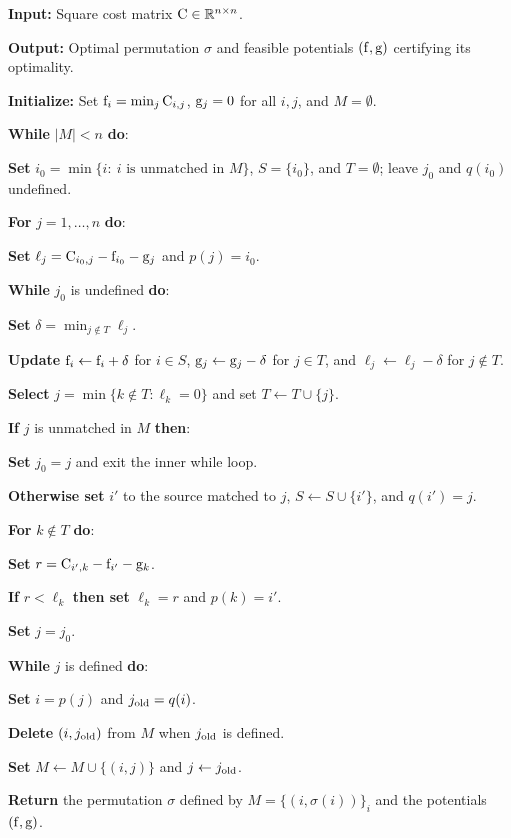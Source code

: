 \begin{algH}\label{alg:hungarian-primal-dual}
\textbf{Input:} Square cost matrix $\mathrm{C}\in\mathbb{R}^{n\times n}$.

\textbf{Output:} Optimal permutation $\sigma$ and feasible potentials $(\mathrm{f},\mathrm{g})$ certifying its optimality.

\textbf{Initialize:} Set $\mathrm{f}_i=\min_j \mathrm{C}_{i,j}$, $\mathrm{g}_j=0$ for all $i,j$, and $M=\emptyset$.

\textbf{While} $|M|<n$ \textbf{do}:
\begin{algblock}

\textbf{Set} $i_0=\min\{i:\ i\text{ is unmatched in }M\}$, $S=\{i_0\}$, and $T=\emptyset$; leave $j_0$ and $q(i_0)$ undefined.

\textbf{For} $j=1,\ldots,n$ \textbf{do}:
\begin{algblock}

\textbf{Set} $\ell_j=\mathrm{C}_{i_0,j}-\mathrm{f}_{i_0}-\mathrm{g}_j$ and $p(j)=i_0$.

\end{algblock}
\textbf{While} $j_0$ is undefined \textbf{do}:
\begin{algblock}

\textbf{Set} $\delta=\min_{j\notin T}\ell_j$.

\textbf{Update} $\mathrm{f}_i\leftarrow\mathrm{f}_i+\delta$ for $i\in S$, $\mathrm{g}_j\leftarrow\mathrm{g}_j-\delta$ for $j\in T$, and $\ell_j\leftarrow\ell_j-\delta$ for $j\notin T$.

\textbf{Select} $j=\min\{k\notin T:\ell_k=0\}$ and set $T\leftarrow T\cup\{j\}$.

\textbf{If} $j$ is unmatched in $M$ \textbf{then}:
\begin{algblock}

\textbf{Set} $j_0=j$ and exit the inner while loop.

\end{algblock}
\textbf{Otherwise set} $i'$ to the source matched to $j$, $S\leftarrow S\cup\{i'\}$, and $q(i')=j$.

\textbf{For} $k\notin T$ \textbf{do}:
\begin{algblock}

\textbf{Set} $r=\mathrm{C}_{i',k}-\mathrm{f}_{i'}-\mathrm{g}_k$.

\textbf{If} $r<\ell_k$ \textbf{then set} $\ell_k=r$ and $p(k)=i'$.

\end{algblock}
\end{algblock}

\textbf{Set} $j=j_0$.

\textbf{While} $j$ is defined \textbf{do}:
\begin{algblock}

\textbf{Set} $i=p(j)$ and $j_{\rm old}=q(i)$.

\textbf{Delete} $(i,j_{\rm old})$ from $M$ when $j_{\rm old}$ is defined.

\textbf{Set} $M\leftarrow M\cup\{(i,j)\}$ and $j\leftarrow j_{\rm old}$.
\end{algblock}
\end{algblock}
\algreturnskip
\textbf{Return} the permutation $\sigma$ defined by $M=\{(i,\sigma(i))\}_i$ and the potentials $(\mathrm{f},\mathrm{g})$.
\end{algH}


